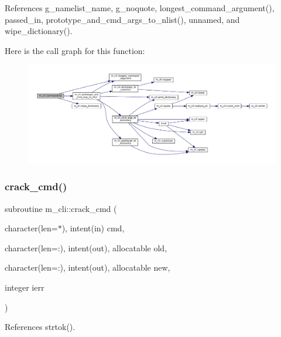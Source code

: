 References g\+\_\+namelist\+\_\+name, g\+\_\+noquote, longest\+\_\+command\+\_\+argument(), passed\+\_\+in, prototype\+\_\+and\+\_\+cmd\+\_\+args\+\_\+to\+\_\+nlist(), unnamed, and wipe\+\_\+dictionary().

Here is the call graph for this function\+:
\nopagebreak
\begin{figure}[H]
\begin{center}
\leavevmode
\includegraphics[width=350pt]{namespacem__cli_a4f639b0c4bf16930fc1c5858ed4196a3_cgraph}
\end{center}
\end{figure}
\mbox{\label{namespacem__cli_a8d5d1954aac6494e07fb11f12f635c85}} 
\subsubsection{\texorpdfstring{crack\+\_\+cmd()}{crack\_cmd()}}
{\footnotesize\ttfamily subroutine m\+\_\+cli\+::crack\+\_\+cmd (\begin{DoxyParamCaption}\item[{character(len=$\ast$), intent(in)}]{cmd,  }\item[{character(len=\+:), intent(out), allocatable}]{old,  }\item[{character(len=\+:), intent(out), allocatable}]{new,  }\item[{integer}]{ierr }\end{DoxyParamCaption})\hspace{0.3cm}{\ttfamily [private]}}



References strtok().

